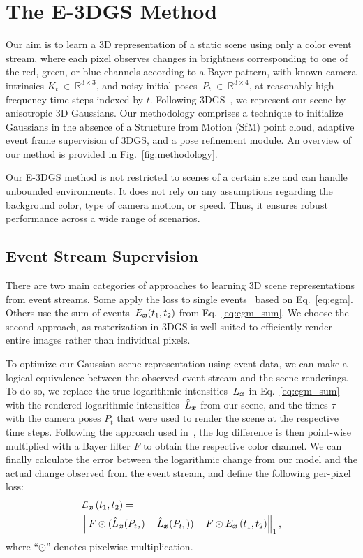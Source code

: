 \section{The E-3DGS Method}\label{sec:Method} 
Our aim is to learn a 3D representation of a static scene using only a color event stream, where each pixel observes changes in brightness corresponding to one of the red, green, or blue channels according to a Bayer pattern, with known camera intrinsics $K_t~\in~\mathbb{R}^{3 \times 3}$, and noisy initial poses~$P_t~\in~\mathbb{R}^{3 \times 4}$, at reasonably high-frequency time steps indexed by $t$. 
Following 3DGS~\cite{3dgs}, we represent our scene by anisotropic 3D Gaussians. Our methodology comprises a technique to initialize Gaussians in the absence of a Structure from Motion (SfM) point cloud, adaptive event frame supervision of 3DGS, and a pose refinement module. 
An overview of our method is provided in Fig.~\ref{fig:methodology}.


Our E-3DGS method is not restricted to scenes of a certain size and can handle unbounded environments. It does not rely on any assumptions regarding the background color, type of camera motion, or speed. Thus, it ensures robust performance across a wide range of scenarios. 

\subsection{Event Stream Supervision} 

There are two main categories of approaches to learning 3D scene representations from event streams. 
Some apply the loss to single events~\cite{robust_enerf} based on Eq.~\eqref{eq:egm}. Others use the sum of events~\( E_{\boldsymbol{x}}(t_1,t_2) \) from Eq.~\eqref{eq:egm_sum}. We choose the second approach, as rasterization in 3DGS is well suited to efficiently render entire images rather than individual pixels. 

To optimize our Gaussian scene representation using event data, we can make a logical equivalence between the observed event stream and the scene renderings. 
To do so, we replace the true logarithmic intensities~\( L_{\boldsymbol{x}} \) in Eq.~\eqref{eq:egm_sum} with the rendered logarithmic intensities~\(\hat{L}_{\boldsymbol{x}} \) from our scene, and the times $\tau$ with the camera poses $P_t$ that were used to render the scene at the respective time steps. 
Following the approach used in~\cite{eventnerf}, the log difference is then point-wise multiplied with a Bayer filter $F$ to obtain the respective color channel. We can finally calculate the error between the logarithmic change from our model and the actual change observed from the event stream, and define the following per-pixel loss: 
\begin{equation}
    \begin{split}
    &\mathcal{L}_{\boldsymbol{x}}\left(t_1, t_2\right) = \\
    &\left\| 
    F \odot (\hat{L}_{\boldsymbol{x}}(P_{t_2}) - \hat{L}_{\boldsymbol{x}}(P_{t_1})) 
    - F \odot E_{\boldsymbol{x}}\left(t_1, t_2\right)\right\|_1, 
    \end{split}
    \label{eq:L_recon_per_pixel} 
\end{equation}
where ``$\odot$'' denotes pixelwise multiplication. 


